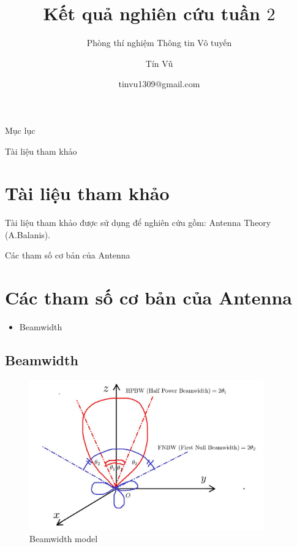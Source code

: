 \documentclass[8pt]{beamer}
\title[Kết quả nghiên cứu tuần 2]
{Kết quả nghiên cứu tuần $2$}
\subtitle{Phòng thí nghiệm Thông tin Vô tuyến}
\author[Phòng thí nghiệm thông tin Vô tuyến]
{Tín Vũ}
\date[VLC 2021] %
{tinvu1309@gmail.com}
\begin{document}
\frame{\titlepage}
\begin{frame}{Mục lục}
\tableofcontents
\end{frame}
\begin{frame}{Tài liệu tham khảo}
\section{Tài liệu tham khảo}
Tài liệu tham khảo được sử dụng để nghiên cứu gồm: Antenna Theory (A.Balanis).
\end{frame}
\begin{frame}{Các tham số cơ bản của Antenna}
\section{Các tham số cơ bản của Antenna}
\begin{itemize}
	\item Beamwidth
\end{itemize}
\subsection{Beamwidth}
\begin{figure}[h]
			\includegraphics[width=0.9\textwidth]{beamwidth.jpg}
			\caption{Beamwidth model}			\label{fig:re1}
\end{figure}
\end{frame}
\end{document}
